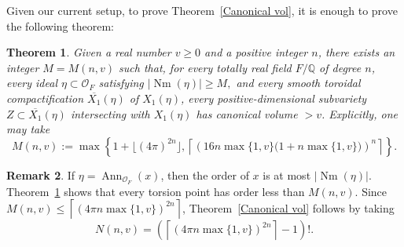 \documentclass[12 pt]{amsart}
\newtheorem{theorem}{Theorem}[section]
\theoremstyle{definition}
\newtheorem{Remark}[theorem]{Remark}
\newcommand{\Xb}{\overline{X_{1}}}
\newcommand{\Nm}{\operatorname{Nm}}
\begin{document}
Given our current setup, to prove Theorem~\ref{Canonical vol}, it is enough to prove the following theorem:


\begin{theorem}\label{Main}
Given a real number $v\ge 0$ and a positive integer $n$, there exists an
integer $M=M(n,v)$ such that, for every totally real
field \(F/\mathbb Q\) of degree \(n\), every ideal
\(\eta\subset\mathcal O_F\) satisfying
\(
|\Nm(\eta)|\geq M,
\) and every smooth toroidal compactification
$\Xb(\eta)$ of $X_1(\eta)$, every positive-dimensional subvariety
$Z\subset\Xb(\eta)$ intersecting with $X_1(\eta)$ has canonical volume
$>v$. Explicitly, one may take
\[
M(n,v):=\max\left\{1+\lfloor(4\pi)^{2n}\rfloor,
\left\lceil\left(16n\max\{1,v\}
\bigl(1+n\max\{1,v\}\bigr)\right)^n\right\rceil\right\}.
\]
\end{theorem}

\begin{Remark}\label{explicit N} If $\eta=\operatorname{Ann}_{\mathcal O_F}(x)$, then the order of $x$ is at most $|\Nm(\eta)|$. Theorem~\ref{Main} shows that every torsion point has order less than $M(n,v).$
Since
\(
M(n,v)\le
\left\lceil
\left(4\pi n\max\{1,v\}\right)^{2n}
\right\rceil
\), 
Theorem~\ref{Canonical vol} follows by taking
\[
N(n,v)=
\left(
\left\lceil
\left(4\pi n\max\{1,v\}\right)^{2n}
\right\rceil-1
\right)!.
\]
\end{Remark}
\end{document}
